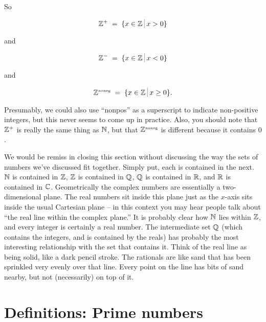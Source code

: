 So 

\[ \Integers^+ \; = \; \{ x \in \Integers \suchthat x > 0 \} \]

\noindent and 

\[ \Integers^- \; = \; \{ x \in \Integers \suchthat x < 0 \} \]

\noindent and 

\[ \Znoneg \; = \; 
\{ x \in \Integers \suchthat x \geq 0 \}. \]

Presumably, we could also use ``nonpos'' as a superscript to indicate
non-positive integers, but this never seems to come up in practice.
Also, you should note that ${\mathbb Z}^+$  is really the same thing
as ${\mathbb N}$, but that  ${\mathbb Z}^{\mbox{\tiny noneg}}$  is different because it 
contains $0$.


We would be remiss in closing this section without discussing the
way the sets of numbers we've discussed fit together.  Simply put,
each is contained in the next.  ${\mathbb N}$ is contained in ${\mathbb Z}$, 
${\mathbb Z}$ is contained in ${\mathbb Q}$, ${\mathbb Q}$ is contained
in ${\mathbb R}$, and ${\mathbb R}$ is contained in ${\mathbb C}$.
Geometrically the complex numbers are essentially a two-dimensional
plane.  The real numbers sit inside this plane just as the $x$-axis
sits inside the usual Cartesian plane -- in this context you may
hear people talk about ``the real line within the complex plane.''
It is probably clear how ${\mathbb N}$ lies within ${\mathbb Z}$, and 
every integer is certainly a real number.  The intermediate set
${\mathbb Q}$ (which contains the integers, and is contained by the
reals) has probably the most interesting relationship with the
set that contains it.  Think of the real line as being solid, like
a dark pencil stroke.  The rationals are like sand that has been
sprinkled very evenly over that line.  Every point on the line
 has bits of sand nearby, but not (necessarily) on top of it.


\newpage




\newpage

\section{Definitions: Prime numbers}
\label{sec:def}

